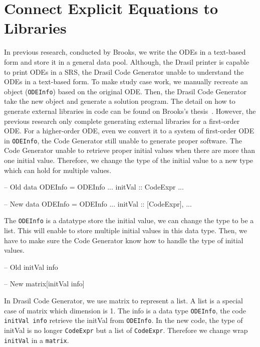 \section{Connect Explicit Equations to Libraries}
\label{se_connecteetolib}

In previous research, conducted by Brooks, we write the ODEs in a text-based form and store it in a general data pool. Although, the Drasil printer is capable to print ODEs in a SRS, the Drasil Code Generator unable to understand the ODEs in a text-based form. To make study case work, we manually recreate an object (\verb|ODEInfo|) based on the original ODE. Then, the Drasil Code Generator take the new object and generate a solution program. The detail on 
how to generate external libraries in code can be found on Brooks's thesis~\citep{brooks}. However, the previous research only complete generating external libraries for a first-order ODE. For a higher-order ODE, even we convert it to a system of first-order ODE in \verb|ODEInfo|, the Code Generator still unable to generate proper software. The Code Generator unable to retrieve proper initial values when there are more than one initial value. Therefore, we change the type of the initial value to a new type which can hold for multiple values. 


\begin{listing}[ht]
\begin{haskell1}
-- Old 
data ODEInfo = ODEInfo {
  ...
  initVal :: CodeExpr
  ...
}

-- New 
data ODEInfo = ODEInfo {
  ...
  initVal :: [CodeExpr],
  ...
}
\end{haskell1}
\end{listing}

The \verb|ODEInfo| is a datatype store the initial value, we can change the type to be a list. This will enable to store multiple initial values in this data type. Then, we have to make sure the Code Generator know how to handle the type of initial values. 

\begin{listing}[ht]
\begin{haskell1}
-- Old 
initVal info

-- New 
matrix[initVal info]  
\end{haskell1}
\end{listing}

In Drasil Code Generator, we use matrix to represent a list. A list is a special case of matrix which dimension is 1. The info is a data type \verb|ODEInfo|, the code \verb|initVal info| retrieve the initVal from \verb|ODEInfo|. In the new code, the type of initVal is no longer \verb|CodeExpr| but a list of \verb|CodeExpr|. Therefore we change wrap \verb|initVal| in a \verb|matrix|.

